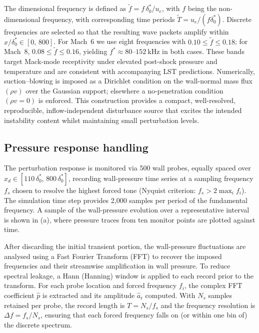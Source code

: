 The dimensional frequency is defined as $\tilde{f} = f\,\delta^{*}_0/u_e$, with $f$ being the non-dimensional frequency, with corresponding time periods $\tilde{T} = u_e / (f \delta_0^*)$. Discrete frequencies are selected so that the resulting wave packets amplify within $x/\delta_0^{*}\in[0,\,800]$. For Mach~6 we use eight frequencies with $0.10 \le \tilde{f} \le 0.18$; for Mach~8, $0.08 \le \tilde{f} \le 0.16$, yielding $f^{*}\approx 80$--$152~\mathrm{kHz}$ in both cases. These bands target Mack-mode receptivity under elevated post-shock pressure and temperature and are consistent with accompanying \gls{LST} predictions. Numerically, suction--blowing is imposed as a Dirichlet condition on the wall-normal mass flux $(\rho v)$ over the Gaussian support; elsewhere a no-penetration condition $(\rho v=0)$ is enforced. This construction provides a compact, well-resolved, reproducible, inflow-independent disturbance source that excites the intended instability content whilst maintaining small perturbation levels.

\subsection{Pressure response handling}

The perturbation response is monitored via 500 wall probes, equally spaced over $x_d \in [110\,\delta^{*}_{0},\,800\,\delta^{*}_{0}]$, recording wall-pressure time series at a sampling frequency $f_s$ chosen to resolve the highest forced tone (Nyquist criterion: $f_s > 2\max_i f_i$). The simulation time step provides 2,000 samples per period of the fundamental frequency. A sample of the wall-pressure evolution over a representative interval is shown in (a), where pressure traces from ten monitor points are plotted against time.


After discarding the initial transient portion, the wall-pressure fluctuations are analysed using a Fast Fourier Transform (FFT) to recover the imposed frequencies and their streamwise amplification in wall pressure. To reduce spectral leakage, a Hann (Hanning) window is applied to each record prior to the transform. For each probe location and forced frequency $f_i$, the complex FFT coefficient $\widehat{p}$ is extracted and its amplitude $\hat{a}_{\mathrm{r}}$ computed. With $N_s$ samples retained per probe, the record length is $T = N_s/f_s$ and the frequency resolution is $\Delta f = f_s/N_s$, ensuring that each forced frequency falls on (or within one bin of) the discrete spectrum.


